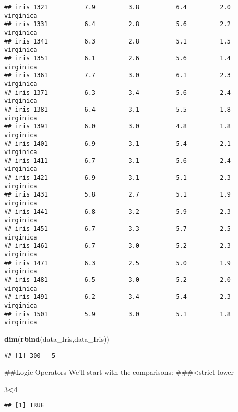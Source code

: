 \documentclass[
]{article}
\newenvironment{Shaded}{\begin{snugshade}}{\end{snugshade}}
\newcommand{\DecValTok}[1]{\textcolor[rgb]{0.00,0.00,0.81}{#1}}
\newcommand{\FunctionTok}[1]{\textcolor[rgb]{0.13,0.29,0.53}{\textbf{#1}}}
\newcommand{\NormalTok}[1]{#1}
\newcommand{\SpecialCharTok}[1]{\textcolor[rgb]{0.81,0.36,0.00}{\textbf{#1}}}
\begin{document}
\begin{verbatim}
## iris 1321          7.9         3.8          6.4         2.0  virginica
## iris 1331          6.4         2.8          5.6         2.2  virginica
## iris 1341          6.3         2.8          5.1         1.5  virginica
## iris 1351          6.1         2.6          5.6         1.4  virginica
## iris 1361          7.7         3.0          6.1         2.3  virginica
## iris 1371          6.3         3.4          5.6         2.4  virginica
## iris 1381          6.4         3.1          5.5         1.8  virginica
## iris 1391          6.0         3.0          4.8         1.8  virginica
## iris 1401          6.9         3.1          5.4         2.1  virginica
## iris 1411          6.7         3.1          5.6         2.4  virginica
## iris 1421          6.9         3.1          5.1         2.3  virginica
## iris 1431          5.8         2.7          5.1         1.9  virginica
## iris 1441          6.8         3.2          5.9         2.3  virginica
## iris 1451          6.7         3.3          5.7         2.5  virginica
## iris 1461          6.7         3.0          5.2         2.3  virginica
## iris 1471          6.3         2.5          5.0         1.9  virginica
## iris 1481          6.5         3.0          5.2         2.0  virginica
## iris 1491          6.2         3.4          5.4         2.3  virginica
## iris 1501          5.9         3.0          5.1         1.8  virginica
\end{verbatim}

\begin{Shaded}
\begin{Highlighting}[]
\FunctionTok{dim}\NormalTok{(}\FunctionTok{rbind}\NormalTok{(data\_Iris,data\_Iris))}
\end{Highlighting}
\end{Shaded}

\begin{verbatim}
## [1] 300   5
\end{verbatim}

\#\#Logic Operators We'll start with the comparisons:
\#\#\#\textless strict lower

\begin{Shaded}
\begin{Highlighting}[]
\DecValTok{3}\SpecialCharTok{\textless{}}\DecValTok{4} 
\end{Highlighting}
\end{Shaded}

\begin{verbatim}
## [1] TRUE
\end{verbatim}
\end{document}
